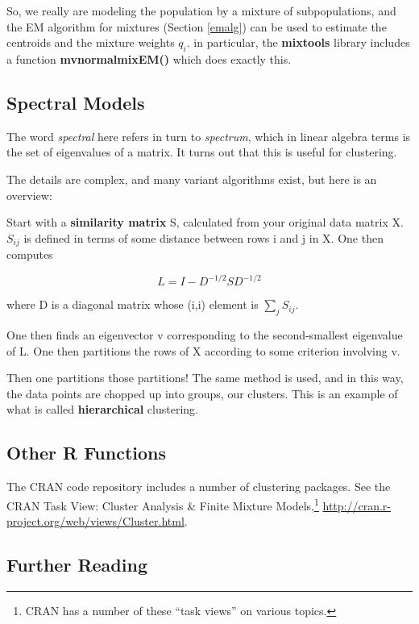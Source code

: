 So, we really are modeling the population by a mixture of
subpopulations, and the EM algorithm for mixtures (Section \ref{emalg})
can be used to estimate the centroids and the mixture weights $q_i$.  in
particular, the {\bf mixtools} library includes a function
{\bf mvnormalmixEM()} which does exactly this.

\subsection{Spectral Models}

The word {\it spectral} here refers in turn to {\it spectrum}, which in
linear algebra terms is the set of eigenvalues of a matrix.  It turns
out that this is useful for clustering.

The details are complex, and many variant algorithms exist, but here is
an overview:

Start with a {\bf similarity matrix} S, calculated from your original
data matrix X.  $S_{ij}$ is defined in terms of some distance between
rows i and j in X.  One then computes

\begin{equation}
L = I - D^{-1/2} S D^{-1/2}
\end{equation}

where D is a diagonal matrix whose (i,i) element is $\sum_{j} S_{ij}$.

One then finds an eigenvector v corresponding to the second-smallest
eigenvalue of L.  One then partitions the rows of X according to some
criterion involving v.

Then one partitions those partitions! The same method is used, and in
this way, the data points are chopped up into groups, our clusters.
This is an example of what is called {\bf hierarchical} clustering.

\subsection{Other R Functions}

The CRAN code repository includes a number of clustering packages.  See
the CRAN Task View: Cluster Analysis \& Finite Mixture
Models,\footnote{CRAN has a number of these ``task views'' on various
topics.} \url{http://cran.r-project.org/web/views/Cluster.html}.

\subsection{Further Reading}

